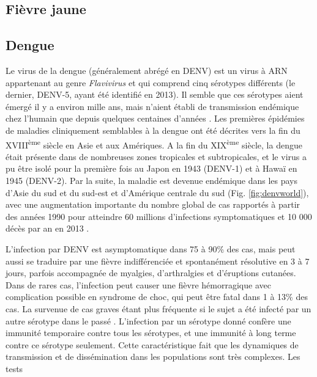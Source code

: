 \subsection{Fièvre jaune}



\subsection{Dengue}
\label{sec:dengue}

Le virus de la dengue (généralement abrégé en DENV) est un virus à ARN appartenant au genre {\em Flavivirus} et qui comprend cinq sérotypes différents (le dernier, DENV-5, ayant été identifié en 2013).
Il semble que ces sérotypes aient émergé il y a environ mille ans, mais n'aient établi de transmission endémique chez l'humain que depuis quelques centaines d'années \cite{holmes2003origin}.
Les premières épidémies de maladies cliniquement semblables à la dengue ont été décrites vers la fin du XVIII\textsuperscript{ème} siècle en Asie et aux Amériques.
A la fin du XIX\textsuperscript{ème} siècle, la dengue était présente dans de nombreuses zones tropicales et subtropicales, et le virus a pu être isolé pour la première fois au Japon en 1943 (DENV-1) et à Hawaï en 1945 (DENV-2).
Par la suite, la maladie est devenue endémique dans les pays d'Asie du sud et du sud-est et d'Amérique centrale du sud (Fig. \ref{fig:denvworld}), avec une augmentation importante du nombre global de cas rapportés à partir des années 1990 pour atteindre 60 millions d'infections symptomatiques et 10 000 décès par an en 2013 \cite{messina2014global,stanaway2016global}.

L'infection par DENV est asymptomatique dans 75 à 90\% des cas, mais peut aussi se traduire par une fièvre indifférenciée et spontanément résolutive en 3 à 7 jours, parfois accompagnée de myalgies, d'arthralgies et d'éruptions cutanées.
Dans de rares cas, l'infection peut causer une fièvre hémorragique avec complication possible en syndrome de choc, qui peut être fatal dans 1 à 13\% des cas. La survenue de cas graves étant plus fréquente si le sujet a été infecté par un autre sérotype dans le passé \cite{simmons2012dengue}.
L'infection par un sérotype donné confère une immunité temporaire contre tous les sérotypes, et une immunité à long terme contre ce sérotype seulement.
Cette caractéristique fait que les dynamiques de transmission et de dissémination dans les populations sont très complexes.
Les tests 

%

